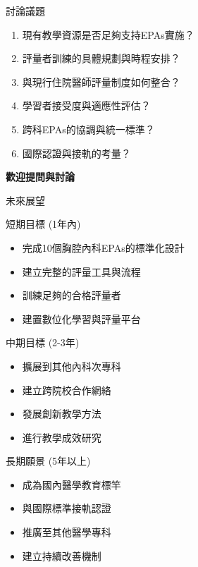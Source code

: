 \documentclass[aspectratio=169]{beamer}
\begin{document}
\begin{frame}{討論議題}
\begin{enumerate}
\item 現有教學資源是否足夠支持EPAs實施？
\item 評量者訓練的具體規劃與時程安排？
\item 與現行住院醫師評量制度如何整合？
\item 學習者接受度與適應性評估？
\item 跨科EPAs的協調與統一標準？
\item 國際認證與接軌的考量？
\end{enumerate}

\vspace{1cm}
\begin{center}
\Large{\textcolor{emergency_blue}{\textbf{歡迎提問與討論}}}
\end{center}
\end{frame}

\begin{frame}{未來展望}
\begin{alertblock}{短期目標 (1年內)}
\begin{itemize}
\item 完成10個胸腔內科EPAs的標準化設計
\item 建立完整的評量工具與流程
\item 訓練足夠的合格評量者
\item 建置數位化學習與評量平台
\end{itemize}
\end{alertblock}

\begin{block}{中期目標 (2-3年)}
\begin{itemize}
\item 擴展到其他內科次專科
\item 建立跨院校合作網絡
\item 發展創新教學方法
\item 進行教學成效研究
\end{itemize}
\end{block}

\begin{exampleblock}{長期願景 (5年以上)}
\begin{itemize}
\item 成為國內醫學教育標竿
\item 與國際標準接軌認證
\item 推廣至其他醫學專科
\item 建立持續改善機制
\end{itemize}
\end{exampleblock}
\end{frame}
\end{document}
